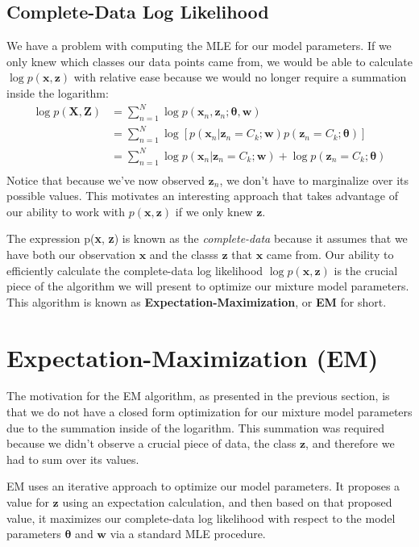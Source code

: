 \subsection{Complete-Data Log Likelihood}
We have a problem with computing the MLE for our model parameters. If we only knew which classes our data points came from, we would be able to calculate $\log p(\textbf{x}, \textbf{z})$ with relative ease because we would no longer require a summation inside the logarithm:
\begin{align} \label{complete-data-log-likelihood}
    \log p(\textbf{X}, \textbf{Z}) &= \sum_{n=1}^{N} \log p(\textbf{x}_n, \textbf{z}_n; \boldsymbol{\theta}, \textbf{w}) \\
    &= \sum_{n=1}^{N} \log[p(\textbf{x}_n | \textbf{z}_n = C_k; \textbf{w}) p(\textbf{z}_n = C_k; \boldsymbol{\theta})] \\
    &= \sum_{n=1}^{N} \log p(\textbf{x}_n | \textbf{z}_n = C_k; \textbf{w}) + \log p(\textbf{z}_n = C_k; \boldsymbol{\theta}) \\
\end{align}
Notice that because we've now observed $\textbf{z}_{n}$, we don't have to marginalize over its possible values. This motivates an interesting approach that takes advantage of our ability to work with $p(\textbf{x}, \textbf{z})$ if we only knew $\textbf{z}$.

The expression p(\textbf{x}, \textbf{z}) is known as the \textit{complete-data} because it assumes that we have both our observation $\textbf{x}$ and the classs $\textbf{z}$ that $\textbf{x}$ came from. Our ability to efficiently calculate the complete-data log likelihood $\log p(\textbf{x}, \textbf{z})$ is the crucial piece of the algorithm we will present to optimize our mixture model parameters. This algorithm is known as \textbf{Expectation-Maximization}, or \textbf{EM} for short.

\section{Expectation-Maximization (EM)}
The motivation for the EM algorithm, as presented in the previous section, is that we do not have a closed form optimization for our mixture model parameters due to the summation inside of the logarithm. This summation was required because we didn't observe a crucial piece of data, the class $\textbf{z}$, and therefore we had to sum over its values.

EM uses an iterative approach to optimize our model parameters. It proposes a value for $\textbf{z}$ using an expectation calculation, and then based on that proposed value, it maximizes our complete-data log likelihood with respect to the model parameters $\boldsymbol{\theta}$ and $\textbf{w}$ via a standard MLE procedure.

